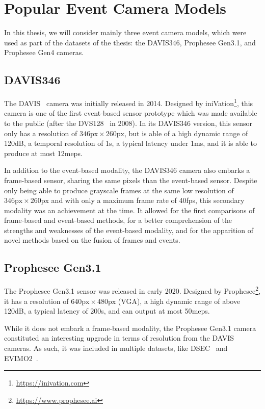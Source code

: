 \section{Popular Event Camera Models}
In this thesis, we will consider mainly three event camera models, which were used as part of the datasets of the thesis: the DAVIS346, Prophesee Gen3.1, and Prophesee Gen4 cameras.

\subsection{DAVIS346}
The DAVIS~\cite{Brandli2014A2} camera was initially released in 2014. Designed by iniVation\footnote{\url{https://inivation.com}}, this camera is one of the first event-based sensor prototype which was made available to the public (after the DVS128~\cite{Lichtsteiner2008A11} in 2008). In its DAVIS346 version, this sensor only has a resolution of \(346\text{px} \times 260\text{px}\), but is able of a high dynamic range of 120dB, a temporal resolution of 1\textmu{}s, a typical latency under 1ms, and it is able to produce at most 12\acrshort{meps}.

In addition to the event-based modality, the DAVIS346 camera also embarks a frame-based sensor, sharing the same pixels than the event-based sensor. Despite only being able to produce grayscale frames at the same low resolution of \(346\text{px} \times 260\text{px}\) and with only a maximum frame rate of 40\acrshort{fps}, this secondary modality was an achievement at the time. It allowed for the first comparisons of frame-based and event-based methods, for a better comprehension of the strengths and weaknesses of the event-based modality, and for the apparition of novel methods based on the fusion of frames and events.

\subsection{Prophesee Gen3.1}
The Prophesee Gen3.1 sensor was released in early 2020. Designed by Prophesee\footnote{\url{https://www.prophesee.ai}}, it has a resolution of \(640\text{px} \times 480\text{px}\) (VGA), a high dynamic range of above 120dB, a typical latency of 200\textmu{}s, and can output at most 50\acrshort{meps}.

While it does not embark a frame-based modality, the Prophesee Gen3.1 camera constituted an interesting upgrade in terms of resolution from the DAVIS cameras. As such, it was included in multiple datasets, like DSEC~\cite{Gehrig2021DSECAS} and EVIMO2~\cite{Burner2022EVIMO2AE}.

